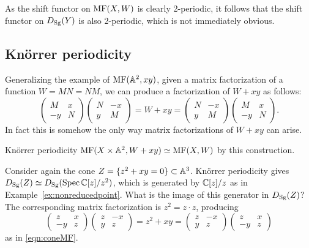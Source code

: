 \begin{remark}{}{}
    As the shift functor on $\mathrm{MF}(X,W)$ is clearly 2-periodic, it follows that
    the shift functor on $D_{\mathrm{Sg}}(Y)$ is also 2-periodic, which is not immediately
    obvious.
\end{remark}

\subsection{Kn\"orrer periodicity}\label{subsec:knorrer}

Generalizing the example of $\mathrm{MF}(\mathbb{A}^2,xy)$, given a matrix factorization of a
function $W=MN=NM$, we can produce a factorization of $W+xy$ as follows:
\begin{equation*}
    \begin{pmatrix}
        M & x \\ -y & N
    \end{pmatrix}\begin{pmatrix}
        N & -x \\ y & M
    \end{pmatrix}
        = W+xy =
    \begin{pmatrix}
        N & -x \\ y & M
    \end{pmatrix}\begin{pmatrix}
        M & x \\ -y & N
    \end{pmatrix}.
\end{equation*}
In fact this is somehow the only way matrix factorizations of $W+xy$ can arise.

\begin{theorem}{Kn\"orrer periodicity}{}
    $\mathrm{MF}(X\times\mathbb{A}^2,W+xy)\simeq\mathrm{MF}(X,W)$ by this construction.
\end{theorem}

\begin{example}{}{}
    Consider again the cone $Z=\{z^2+xy=0\}\subset\mathbb{A}^3$. Kn\"orrer periodicity
    gives $D_{\mathrm{Sg}}(Z)\simeq D_{\mathrm{Sg}}(\operatorname{Spec}\mathbb{C}[z]/z^2)$, which is generated by
    $\mathbb{C}[z]/z$ as in Example~\ref{ex:nonreducedpoint}. What is the image of this
    generator in $D_{\mathrm{Sg}}(Z)$? The corresponding matrix factorization is
    $z^2=z\cdot z$, producing
    \begin{equation*}
        \begin{pmatrix}
            z & x \\ -y & z
        \end{pmatrix}\begin{pmatrix}
            z & -x \\ y & z
        \end{pmatrix} = z^2+xy = \begin{pmatrix}
            z & -x \\ y & z
        \end{pmatrix}\begin{pmatrix}
            z & x \\ -y & z
        \end{pmatrix}
    \end{equation*}
    as in \eqref{eqn:coneMF}.
\end{example}

